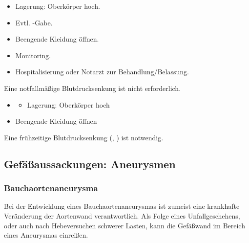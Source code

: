 {
\begin{itemize}
  \item Lagerung: Oberkörper hoch.
  \item Evtl. -Gabe.
  \item Beengende Kleidung öffnen.
  \item Monitoring.
  \item  Hospitalisierung oder Notarzt zur
  Behandlung/Belassung.
\end{itemize}
Eine notfallmäßige Blutdrucksenkung ist nicht erforderlich.
}

{
\begin{itemize}
  \item \TxMassVitBes
  \begin{itemize}
    \item Lagerung: Oberkörper hoch
  \end{itemize}
  \item Beengende Kleidung öffnen
\end{itemize}

Eine frühzeitige Blutdrucksenkung (, )
ist notwendig. 

}




\subsection{Gefäßaussackungen: Aneurysmen}

\subsubsection{Bauchaortenaneurysma}
\nocite{Meron2004}

{%
Bei der Entwicklung eines Bauchaortenaneurysmas ist zumeist
eine krankhafte Veränderung der Aortenwand
verantwortlich. Als Folge eines Unfallgeschehens,
oder auch nach Hebeversuchen schwerer Lasten, kann die
Gefäßwand im Bereich eines Aneurysmas einreißen. 
}
{\SymbolText}{}{}{}

